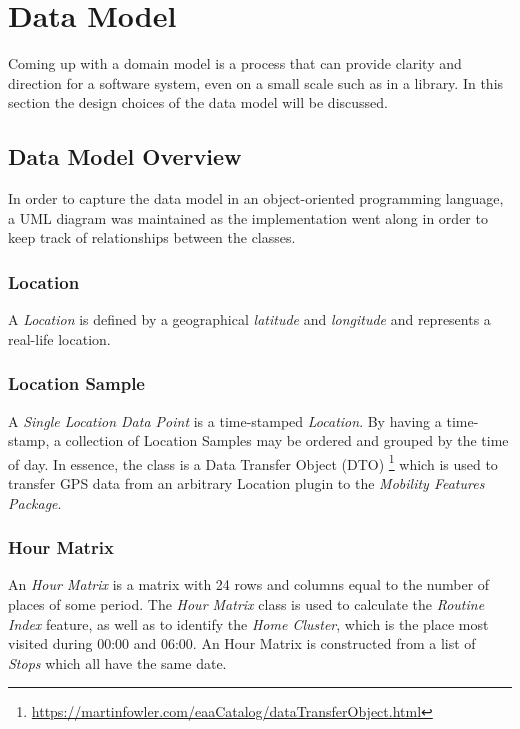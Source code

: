 \section{Data Model}
Coming up with a domain model is a process that can provide clarity and direction for a software system, even on a small scale such as in a library. In this section the design choices of the data model will be discussed.

\subsection{Data Model Overview}
In order to capture the data model in an object-oriented programming language, a UML diagram was maintained as the implementation went along in order to keep track of relationships between the classes. 

\subsubsection*{Location}
A \textit{Location} is defined by a geographical \textit{latitude} and \textit{longitude} and represents a real-life location.

\subsubsection*{Location Sample}
A \textit{Single Location Data Point} is a time-stamped \textit{Location}. By having a time-stamp, a collection of Location Samples may be ordered and grouped by the time of day. In essence, the class is a Data Transfer Object (DTO) \footnote{\url{https://martinfowler.com/eaaCatalog/dataTransferObject.html}} which is used to transfer GPS data from an arbitrary Location plugin to the \textit{Mobility Features Package}.

\subsubsection*{Hour Matrix}
An \textit{Hour Matrix} is a matrix with 24 rows and columns equal to the number of places of some period. The \textit{Hour Matrix} class is used to calculate the \textit{Routine Index} feature, as well as to identify the \textit{Home Cluster}, which is the place most visited during 00:00 and 06:00. An Hour Matrix is constructed from a list of \textit{Stops} which all have the same date.

